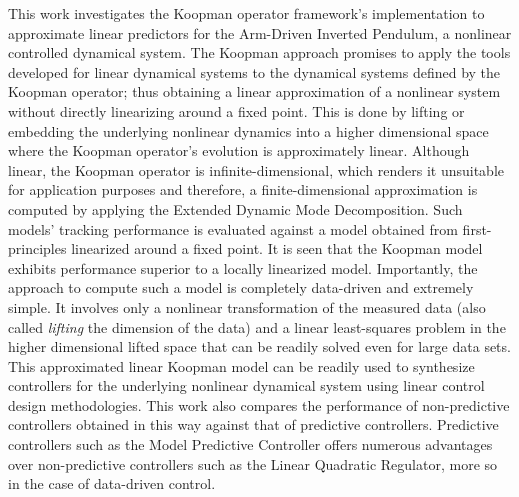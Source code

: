 This work investigates the Koopman operator framework's implementation to approximate linear predictors for the Arm-Driven Inverted Pendulum, a nonlinear controlled dynamical system. The Koopman approach promises to apply the tools developed for linear dynamical systems to the dynamical systems defined by the Koopman operator; thus obtaining a linear approximation of a nonlinear system without directly linearizing around a fixed point. This is done by lifting or embedding the underlying nonlinear dynamics into a higher dimensional space where the Koopman operator's evolution is approximately linear. Although linear, the Koopman operator is infinite-dimensional, which renders it unsuitable for application purposes and therefore, a finite-dimensional approximation is computed by applying the Extended Dynamic Mode Decomposition. Such models' tracking performance is evaluated against a model obtained from first-principles linearized around a fixed point. It is seen that the Koopman model exhibits performance superior to a locally linearized model. Importantly, the approach to compute such a model is completely data-driven and extremely simple. It involves only a nonlinear transformation of the measured data (also called \textit{lifting} the dimension of the data) and a linear least-squares problem in the higher dimensional lifted space that can be readily solved even for large data sets. This approximated linear Koopman model can be readily used to synthesize controllers for the underlying nonlinear dynamical system using linear control design methodologies. This work also compares the performance of non-predictive controllers obtained in this way against that of predictive controllers. Predictive controllers such as the Model Predictive Controller offers numerous advantages over non-predictive controllers such as the Linear Quadratic Regulator, more so in the case of data-driven control.